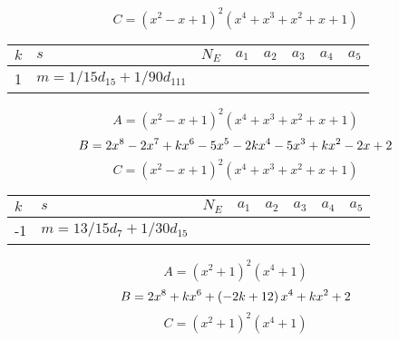 \documentclass{amsart}
\begin{document}
$$C=(x^2
 - x
 + 1)^{2}(x^4
 + x^3
 + x^2
 + x
 + 1)$$
\begin{longtable}{|l|l|l|lllll|}
\hline
$k$ & $s$ & $N_E$ & $a_1$ & $a_2$ & $a_3$ & $a_4$ & $a_5$\\
\hline
1&$m=1/15d_{15}+1/90d_{111}$&&\multicolumn{5}{c|}{}\\
\hline
\end{longtable}
$$A=(x^2
 - x
 + 1)^{2}(x^4
 + x^3
 + x^2
 + x
 + 1)$$
$$B=2\*x^8
 - 2\*x^7
 + k\*x^6
 - 5\*x^5
 - 2\*k\*x^4
 - 5\*x^3
 + k\*x^2
 - 2\*x
 + 2$$
$$C=(x^2
 - x
 + 1)^{2}(x^4
 + x^3
 + x^2
 + x
 + 1)$$
\begin{longtable}{|l|l|l|lllll|}
\hline
$k$ & $s$ & $N_E$ & $a_1$ & $a_2$ & $a_3$ & $a_4$ & $a_5$\\
\hline
-1&$m=13/15d_{7}+1/30d_{15}$&&\multicolumn{5}{c|}{}\\
\hline
\end{longtable}
$$A=(x^2
 + 1)^{2}(x^4
 + 1)$$
$$B=2\*x^8
 + k\*x^6
 + \left(-2\*k
 + 12\right) \*x^4
 + k\*x^2
 + 2$$
$$C=(x^2
 + 1)^{2}(x^4
 + 1)$$
\end{document}
